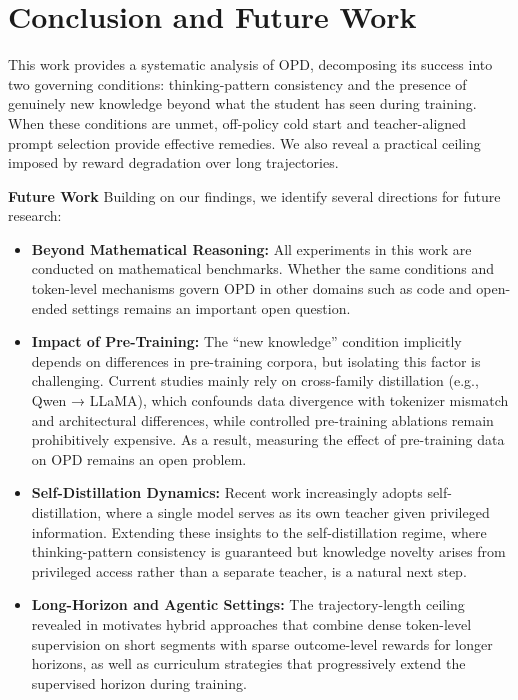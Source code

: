 \section{Conclusion and Future Work}

This work provides a systematic analysis of OPD, decomposing its success into two governing conditions: thinking-pattern consistency and the presence of genuinely new knowledge beyond what the student has seen during training.
When these conditions are unmet, off-policy cold start and teacher-aligned prompt selection provide effective remedies.
We also reveal a practical ceiling imposed by reward degradation over long trajectories.



\textbf{Future Work} \quad Building on our findings, we identify several directions for future research:
\begin{itemize}[leftmargin=12pt]
    \item \textbf{Beyond Mathematical Reasoning:} All experiments in this work are conducted on mathematical benchmarks. Whether the same conditions and token-level mechanisms govern OPD in other domains such as code and open-ended settings remains an important open question.
    \item \textbf{Impact of Pre-Training:} The “new knowledge” condition implicitly depends on differences in pre-training corpora, but isolating this factor is challenging. Current studies mainly rely on cross-family distillation (e.g., Qwen → LLaMA), which confounds data divergence with tokenizer mismatch and architectural differences, while controlled pre-training ablations remain prohibitively expensive. As a result, measuring the effect of pre-training data on OPD remains an open problem.
    \item \textbf{Self-Distillation Dynamics:} Recent work increasingly adopts self-distillation, where a single model serves as its own teacher given privileged information.
    Extending these insights to the self-distillation regime, where thinking-pattern consistency is guaranteed but knowledge novelty arises from privileged access rather than a separate teacher, is a natural next step.
    \item \textbf{Long-Horizon and Agentic Settings:} The trajectory-length ceiling revealed in  motivates hybrid approaches that combine dense token-level supervision on short segments with sparse outcome-level rewards for longer horizons, as well as curriculum strategies that progressively extend the supervised horizon during training.
\end{itemize}


